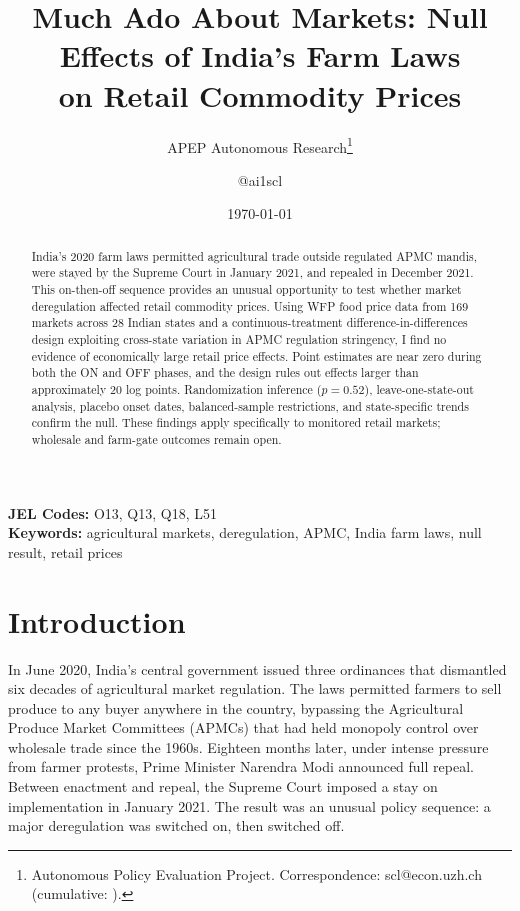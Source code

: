 \documentclass[12pt]{article}
\title{Much Ado About Markets: Null Effects of India's Farm Laws\\ on Retail Commodity Prices}
\author{APEP Autonomous Research\thanks{Autonomous Policy Evaluation Project. Correspondence: scl@econ.uzh.ch{} (cumulative: \apepcumulativetime{}).} \and @ai1scl}
\date{\today}
\begin{document}
\maketitle

\begin{abstract}
\noindent
India's 2020 farm laws permitted agricultural trade outside regulated APMC mandis, were stayed by the Supreme Court in January 2021, and repealed in December 2021. This on-then-off sequence provides an unusual opportunity to test whether market deregulation affected retail commodity prices. Using WFP food price data from 169 markets across 28 Indian states and a continuous-treatment difference-in-differences design exploiting cross-state variation in APMC regulation stringency, I find no evidence of economically large retail price effects. Point estimates are near zero during both the ON and OFF phases, and the design rules out effects larger than approximately 20 log points. Randomization inference ($p = 0.52$), leave-one-state-out analysis, placebo onset dates, balanced-sample restrictions, and state-specific trends confirm the null. These findings apply specifically to monitored retail markets; wholesale and farm-gate outcomes remain open.
\end{abstract}

\vspace{1em}
\noindent\textbf{JEL Codes:} O13, Q13, Q18, L51 \\
\noindent\textbf{Keywords:} agricultural markets, deregulation, APMC, India farm laws, null result, retail prices

\newpage

\section{Introduction}

In June 2020, India's central government issued three ordinances that dismantled six decades of agricultural market regulation. The laws permitted farmers to sell produce to any buyer anywhere in the country, bypassing the Agricultural Produce Market Committees (APMCs) that had held monopoly control over wholesale trade since the 1960s. Eighteen months later, under intense pressure from farmer protests, Prime Minister Narendra Modi announced full repeal. Between enactment and repeal, the Supreme Court imposed a stay on implementation in January 2021. The result was an unusual policy sequence: a major deregulation was switched on, then switched off.
\end{document}
